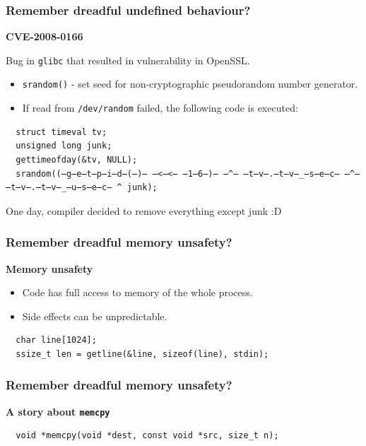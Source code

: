 \documentclass[aspectratio=1610,t]{beamer}
\begin{document}
\begin{frame}[fragile]
\frametitle{Remember dreadful undefined behaviour?}
\textbf{CVE-2008-0166}

Bug in \texttt{glibc} that resulted in vulnerability in OpenSSL.

\begin{itemize}
    \item \texttt{srandom()} - set seed for non-cryptographic pseudorandom number generator.
    \item If read from \texttt{/dev/random} failed, the following code is executed:
\end{itemize}

\begin{verbatim}
  struct timeval tv;
  unsigned long junk;
  gettimeofday(&tv, NULL);
  srandom((̶g̶e̶t̶p̶i̶d̶(̶)̶ ̶<̶<̶ ̶1̶6̶)̶ ̶^̶ ̶t̶v̶.̶t̶v̶_̶s̶e̶c̶ ̶^̶ ̶t̶v̶.̶t̶v̶_̶u̶s̶e̶c̶ ^ junk);
\end{verbatim}

One day, compiler decided to remove everything except junk :D

\end{frame}


\begin{frame}[fragile]
\frametitle{Remember dreadful memory unsafety?}
\textbf{Memory unsafety}

\begin{itemize}
    \item Code has full access to memory of the whole process.
    \item Side effects can be unpredictable.
\end{itemize}

\begin{verbatim}
  char line[1024];
  ssize_t len = getline(&line, sizeof(line), stdin);  
\end{verbatim}

\end{frame}


\begin{frame}[fragile]
\frametitle{Remember dreadful memory unsafety?}
\textbf{A story about \texttt{memcpy}}

\begin{verbatim}
  void *memcpy(void *dest, const void *src, size_t n);
\end{verbatim}

\end{frame}
\end{document}
